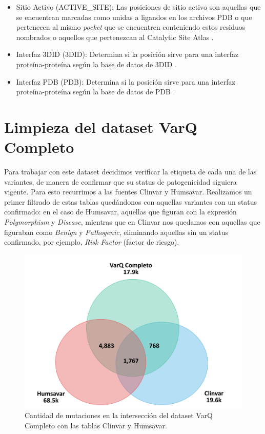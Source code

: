 \begin{itemize}
    \item Sitio Activo (ACTIVE\_SITE): Las posiciones de sitio activo son aquellas que se encuentran marcadas como unidas a ligandos en los archivos PDB o que pertenecen al mismo \textit{pocket} que se encuentren conteniendo estos residuos nombrados o aquellos que pertenezcan al Catalytic Site Atlas \cite{Porter2004}.
    \item Interfaz 3DID (3DID): Determina si la posición sirve para una interfaz proteína-proteína según la base de datos de 3DID \cite{Stein2005}.
    \item Interfaz PDB (PDB): Determina si la posición sirve para una interfaz proteína-proteína según la base de datos de PDB \cite{Berman2003}.
\end{itemize}


\section{Limpieza del dataset VarQ Completo} \label{limpvarq}

Para trabajar con este dataset decidimos verificar la etiqueta de cada una de las variantes, de manera de confirmar que su status de patogenicidad siguiera vigente. Para esto recurrimos a las fuentes Clinvar y Humsavar. Realizamos un primer filtrado de estas tablas quedándonos con aquellas variantes con un status confirmado: en el caso de Humsavar, aquellas que figuran con la expresión \textit{Polymorphism} y \textit{Disease}, mientras que en Clinvar nos quedamos con aquellas que figuraban como \textit{Benign} y \textit{Pathogenic}, eliminando aquellas sin un status confirmado, por ejemplo, \textit{Risk Factor} (factor de riesgo). 

\begin{figure}[H]
    \centering
    \includegraphics[scale=0.4]{documents/latex/figures/3/varq/interseccion_varq.pdf}
    \caption{Cantidad de mutaciones en la intersección del dataset VarQ Completo con las tablas Clinvar y Humsavar.}
    \label{fig:interseccion_varq}
\end{figure}

